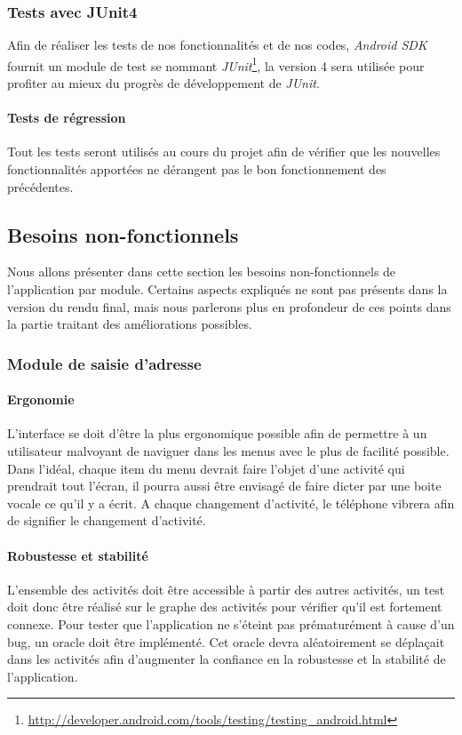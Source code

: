 {\subsubsection{Tests avec JUnit4}
Afin de réaliser les tests de nos fonctionnalités et de nos codes, \textit{Android SDK} fournit un module de test se nommant \textit{JUnit}\footnote{\url{http://developer.android.com/tools/testing/testing_android.html}}, la version 4 sera utilisée pour profiter au mieux du progrès de développement de \textit{JUnit}. 
\paragraph{Tests de régression} Tout les tests seront utilisés au cours du projet afin de vérifier que les nouvelles fonctionnalités apportées ne dérangent pas le bon fonctionnement des précédentes.

\subsection{Besoins non-fonctionnels}
Nous allons présenter dans cette section les besoins non-fonctionnels de l'application par module. Certains aspects expliqués ne sont pas présents dans la version du rendu final, mais nous parlerons plus en profondeur de ces points dans la partie traitant des améliorations possibles.

\subsubsection{Module de saisie d'adresse}
\paragraph{Ergonomie}
L'interface se doit d'être la plus ergonomique possible afin de permettre à un utilisateur malvoyant de naviguer dans les menus avec le plus de facilité possible. Dans l'idéal, chaque item du menu devrait faire l'objet d'une activité qui prendrait tout l'écran, il pourra aussi être envisagé de faire dicter par une boite vocale ce qu'il y a écrit. A chaque changement d'activité, le téléphone vibrera afin de signifier le changement d'activité.

\paragraph{Robustesse et stabilité}
L'ensemble des activités doit être accessible à partir des autres activités, un test doit donc être réalisé sur le graphe des activités pour vérifier qu'il est fortement connexe. Pour tester que l'application ne s'éteint pas prématurément à cause d'un bug, un oracle doit être implémenté. Cet oracle devra aléatoirement se déplaçait dans les activités afin d'augmenter la confiance en la robustesse et la stabilité de l'application.

}
